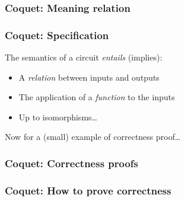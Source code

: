         \begin{frame}
            \frametitle{Coquet: Meaning relation}
        \end{frame}

        \begin{frame}
            \frametitle{Coquet: Specification}

            \vspace{0.5cm}
            \par{The semantics of a circuit \emph{entails} (implies):}
            \begin{itemize}
                \item A \emph{relation} between inputs and outputs
                \item The application of a \emph{function} to the inputs
                \item Up to isomorphisms\ldots
            \end{itemize}
            \par{Now for a (small) example of correctness proof\ldots}
        \end{frame}

        \begin{frame}
            \frametitle{Coquet: Correctness proofs}
        \end{frame}

        \begin{frame}
            \frametitle{Coquet: How to prove correctness}
        \end{frame}

